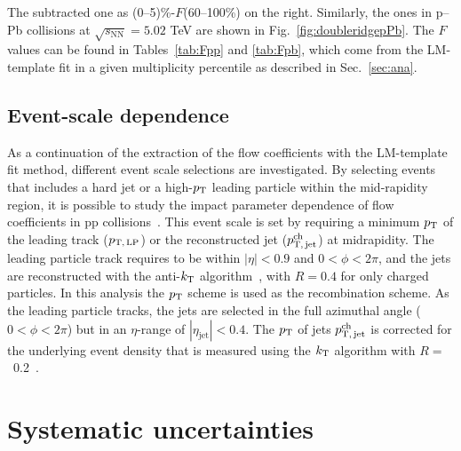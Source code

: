 The subtracted one as (0--5)\%-$F$(60--100\%) on the right. Similarly, the ones in p--Pb collisions at $\sqrt{s_{\mathrm{NN}}}=5.02$ TeV are shown in Fig.~\ref{fig:doubleridgepPb}. The $F$ values can be found in Tables~\ref{tab:Fpp} and \ref{tab:Fpb}, which come from the LM-template fit in a given multiplicity percentile as described in Sec.~\ref{sec:ana}. 


\subsection{Event-scale dependence}
As a continuation of the extraction of the flow coefficients with the LM-template fit method, different event scale selections are investigated. By selecting events that includes a hard jet or a high-$p_\mathrm{T}$ leading particle within the mid-rapidity region, it is possible to study the impact parameter dependence of flow coefficients in pp collisions~\cite{Sjostrand:1986ep,Frankfurt:2010ea}. This event scale is set by requiring a minimum $p_\mathrm{T}$ of the leading track ($p_\mathrm{T,\,LP}$) or the reconstructed jet ($p_\mathrm{T,\,jet}^\mathrm{ch}$) at midrapidity. The leading particle track requires to be within $|\eta|<0.9$ and $0<\phi<2\pi$, and the jets are reconstructed with the anti-$k_{\rm{T}}$ algorithm~\cite{Cacciari:2008gp,Cacciari:2011ma}, with $R=0.4$ for only charged particles. In this analysis the $p_\mathrm{T}$ scheme is used as the recombination scheme. As the leading particle tracks, the jets are selected in the full azimuthal angle ($0<\phi<2\pi$) but in an $\eta$-range of $|\eta_\mathrm{jet}|<0.4$. The $p_\mathrm{T}$ of jets $p_\mathrm{T,\,jet}^\mathrm{ch}$ is corrected for the underlying event density that is measured using the $k_{\rm{T}}$ algorithm with $R=$~0.2~\cite{Acharya:2018eat}.


\section{Systematic uncertainties}
\label{sec:uncertainties}

